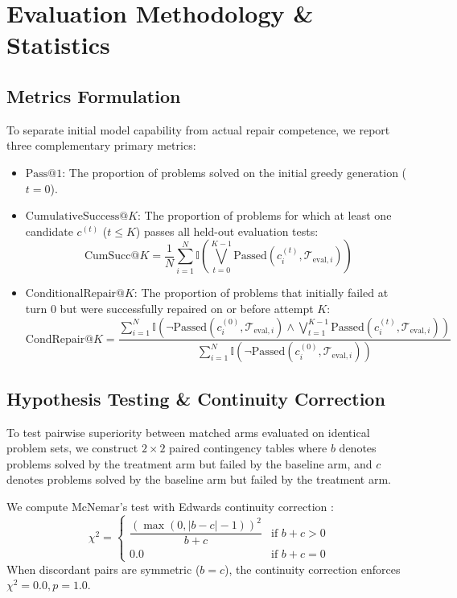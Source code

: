 \documentclass[letterpaper]{article} %
\begin{document}
\section{Evaluation Methodology \& Statistics}
\label{sec:eval}

\subsection{Metrics Formulation}
To separate initial model capability from actual repair competence, we report three complementary primary metrics:
\begin{itemize}
    \item \textbf{$\text{Pass@1}$}: The proportion of problems solved on the initial greedy generation ($t=0$).
    \item \textbf{$\text{CumulativeSuccess}@K$}: The proportion of problems for which at least one candidate $c^{(t)}$ ($t \le K$) passes all held-out evaluation tests:
    \begin{equation}
    \text{CumSucc}@K = \frac{1}{N} \sum_{i=1}^N \mathbb{I}\left(\bigvee_{t=0}^{K-1} \text{Passed}(c_i^{(t)}, \mathcal{T}_{\text{eval}, i})\right)
    \end{equation}
    \item \textbf{$\text{ConditionalRepair}@K$}: The proportion of problems that initially failed at turn 0 but were successfully repaired on or before attempt $K$:
    \begin{equation}
    \text{CondRepair}@K = \frac{\sum_{i=1}^N \mathbb{I}\left(\neg \text{Passed}(c_i^{(0)}, \mathcal{T}_{\text{eval}, i}) \wedge \bigvee_{t=1}^{K-1} \text{Passed}(c_i^{(t)}, \mathcal{T}_{\text{eval}, i})\right)}{\sum_{i=1}^N \mathbb{I}\left(\neg \text{Passed}(c_i^{(0)}, \mathcal{T}_{\text{eval}, i})\right)}
    \end{equation}
\end{itemize}

\subsection{Hypothesis Testing \& Continuity Correction}
To test pairwise superiority between matched arms evaluated on identical problem sets, we construct $2 \times 2$ paired contingency tables where $b$ denotes problems solved by the treatment arm but failed by the baseline arm, and $c$ denotes problems solved by the baseline arm but failed by the treatment arm.

We compute McNemar's test with Edwards continuity correction \citep{mcnemar1947,edwards1948}:
\begin{equation}
\chi^2 = 
\begin{cases}
\dfrac{\left(\max(0, |b - c| - 1)\right)^2}{b + c} & \text{if } b + c > 0 \\
0.0 & \text{if } b + c = 0
\end{cases}
\end{equation}
When discordant pairs are symmetric ($b = c$), the continuity correction enforces $\chi^2 = 0.0, p = 1.0$.
\end{document}
